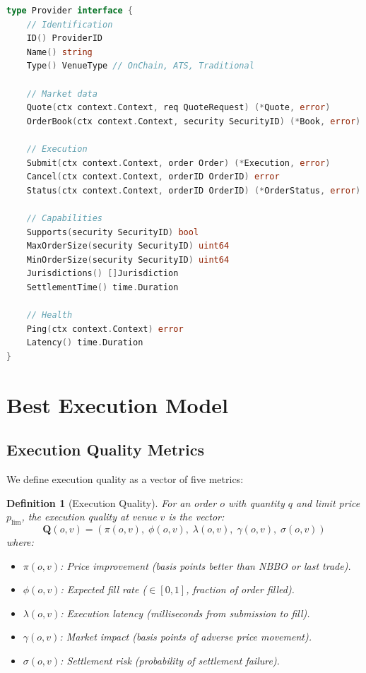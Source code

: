 \documentclass[11pt,a4paper]{article}
\newtheorem{definition}{Definition}
\begin{document}
\begin{lstlisting}[language=Go,caption={Provider interface.}]
type Provider interface {
    // Identification
    ID() ProviderID
    Name() string
    Type() VenueType // OnChain, ATS, Traditional

    // Market data
    Quote(ctx context.Context, req QuoteRequest) (*Quote, error)
    OrderBook(ctx context.Context, security SecurityID) (*Book, error)

    // Execution
    Submit(ctx context.Context, order Order) (*Execution, error)
    Cancel(ctx context.Context, orderID OrderID) error
    Status(ctx context.Context, orderID OrderID) (*OrderStatus, error)

    // Capabilities
    Supports(security SecurityID) bool
    MaxOrderSize(security SecurityID) uint64
    MinOrderSize(security SecurityID) uint64
    Jurisdictions() []Jurisdiction
    SettlementTime() time.Duration

    // Health
    Ping(ctx context.Context) error
    Latency() time.Duration
}
\end{lstlisting}

\section{Best Execution Model}\label{sec:model}

\subsection{Execution Quality Metrics}

We define execution quality as a vector of five metrics:

\begin{definition}[Execution Quality]
For an order $o$ with quantity $q$ and limit price $p_{\text{lim}}$, the execution quality at venue $v$ is the vector:
\[
\mathbf{Q}(o, v) = \left( \pi(o,v),\; \phi(o,v),\; \lambda(o,v),\; \gamma(o,v),\; \sigma(o,v) \right)
\]
where:
\begin{itemize}[nosep]
  \item $\pi(o,v)$: Price improvement (basis points better than NBBO or last trade).
  \item $\phi(o,v)$: Expected fill rate ($\in [0, 1]$, fraction of order filled).
  \item $\lambda(o,v)$: Execution latency (milliseconds from submission to fill).
  \item $\gamma(o,v)$: Market impact (basis points of adverse price movement).
  \item $\sigma(o,v)$: Settlement risk (probability of settlement failure).
\end{itemize}
\end{definition}
\end{document}
